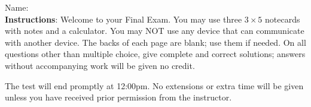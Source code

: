 \documentclass[addpoints]{exam}
\begin{document}
		
\vspace*{0pt}

\noindent
Name: \underline{\hspace{2in}} \\


\noindent
\textbf{Instructions}: Welcome to your Final Exam. You may use three $3 \times 5$ notecards with notes and a calculator. You may NOT use any device that can communicate  with another device. The backs of each page are blank; use them if needed. On all questions other than multiple choice, give complete and correct solutions; answers without accompanying work will be given no credit. 

The test will end promptly at 12:00pm. No extensions or extra time will be given unless you have received prior permission from the instructor.
\end{document}
